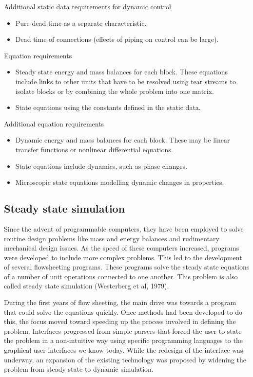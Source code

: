 Additional static data requirements for dynamic control
\begin{itemize}
\item Pure dead time as a separate characteristic.
\item Dead time of connections (effects of piping on control can be
  large).
\end{itemize}

Equation requirements
\begin{itemize}
\item Steady state energy and mass balances for each block.  These
  equations include links to other units that have to be resolved
  using tear streams to isolate blocks or by combining the whole
  problem into one matrix.
\item State equations using the constants defined in the static data.
\end{itemize}

Additional equation requirements
\begin{itemize}
\item Dynamic energy and mass balances for each block.  These may be
  linear transfer functions or nonlinear differential equations.
\item State equations include dynamics, such as phase changes.
\item Microscopic state equations modelling dynamic changes in
  properties.
\end{itemize}

\subsection{Steady state simulation}
Since the advent of programmable computers, they have been employed to
solve routine design problems like mass and energy balances and
rudimentary mechanical design issues.  As the speed of these computers
increased, programs were developed to include more complex problems.
This led to the development of several flowsheeting programs.  These
programs solve the steady state equations of a number of unit
operations connected to one another.  This problem is also called
steady state simulation (Westerberg et al, 1979).

During the first years of flow sheeting, the main drive was towards a
program that could solve the equations quickly.  Once methods had been
developed to do this, the focus moved toward speeding up the process
involved in defining the problem.  Interfaces progressed from simple
parsers that forced the user to state the problem in a non-intuitive
way using specific programming languages to the graphical user
interfaces we know today.  While the redesign of the interface was
underway, an expansion of the existing technology was proposed by
widening the problem from steady state to dynamic simulation.

